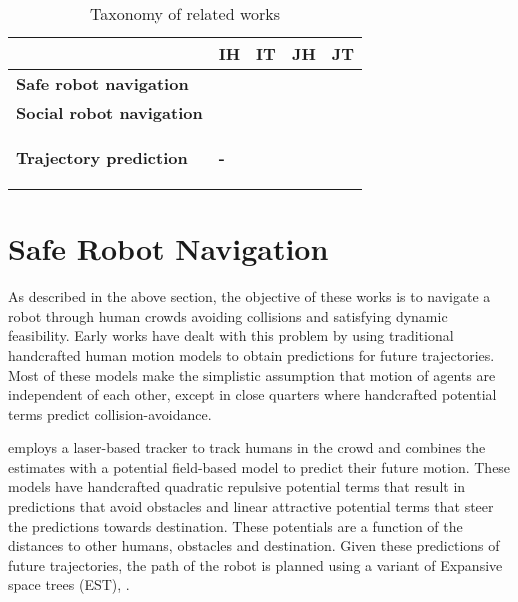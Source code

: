 \begin{table}[H]
  \centering
  \begin{tabular}{|p{5cm}|p{1.5cm}|p{1.5cm}|p{1.5cm}|p{1.5cm}|}
    \hline
     & \textbf{IH} & \textbf{IT} & \textbf{JH} & \textbf{JT}\\
    \hline
    \textbf{Safe robot navigation} & \cite{hoeller2007accompanying} & \cite{aoude2013probabilistically}& \cite{trautman15} & \cite{kim2014brvo} \\
    \hline
    \textbf{Social robot navigation} & \cite{kirby2009companion} & \cite{kim2016socially} & \cite{shiomi2014towards} & \cite{Kretzschmar16} \\
    \hline
    \textbf{Trajectory prediction} & \begin{center}{\textbf{-}}\end{center} & \cite{joseph2011bayesian, kitani2012activity} & \cite{luber2010people} & \cite{pellegrini2010improving, alahi16} \\
    \hline
  \end{tabular}
  \caption{Taxonomy of related works}
  \label{tab:taxonomy}
\end{table}

\section{Safe Robot Navigation}
\label{sec:survey-safe-robot-navig-1}

As described in the above section, the objective of these works is to navigate a robot through human crowds avoiding collisions and satisfying dynamic feasibility. Early works have dealt with this problem by using traditional handcrafted human motion models to obtain predictions for future trajectories. Most of these models make the simplistic assumption that motion of agents are independent of each other, except in close quarters where handcrafted potential terms predict collision-avoidance.

\cite{hoeller2007accompanying} employs a laser-based tracker to track humans in the crowd and combines the estimates with a potential field-based model to predict their future motion. These models have handcrafted quadratic repulsive potential terms that result in predictions that avoid obstacles and linear attractive potential terms that steer the predictions towards destination. These potentials are a function of the distances to other humans, obstacles and destination. Given these predictions of future trajectories, the path of the robot is planned using a variant of Expansive space trees (EST), \cite{hsu02}.

